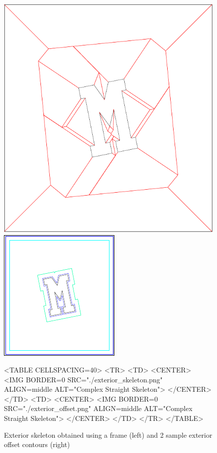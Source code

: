 \begin{figure}[htbp]
\begin{ccTexOnly}
\begin{center}
\includegraphics{Straight_skeleton_2/exterior_skeleton} %
\end{center}
\begin{center}
\includegraphics{Straight_skeleton_2/exterior_offset} %
\end{center}
\end{ccTexOnly}

\begin{ccHtmlOnly}
<TABLE CELLSPACING=40>
<TR>
<TD>
<CENTER>
<IMG BORDER=0 SRC="./exterior_skeleton.png" ALIGN=middle ALT="Complex Straight Skeleton">
</CENTER>
</TD>
<TD>
<CENTER>
<IMG BORDER=0 SRC="./exterior_offset.png" ALIGN=middle ALT="Complex Straight Skeleton">
</CENTER>
</TD>
</TR>
</TABLE>
\end{ccHtmlOnly}

\caption{Exterior skeleton obtained using a frame (left) and 2 sample exterior offset contours (right)
\label{Exterior}}
\end{figure}

